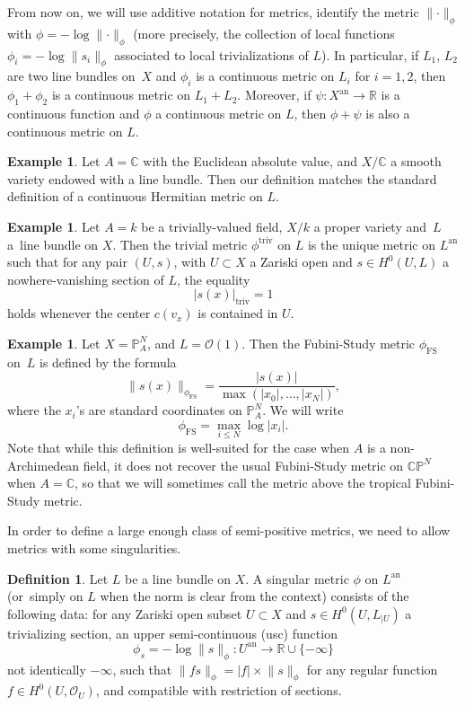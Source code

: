 \documentclass[JEP,XML,SOM,Unicode,published]{cedram}
\theoremstyle{definition}
\newtheorem{defn}[equation]{Definition}
\newtheorem{ex}[equation]{Example}
\newcommand \C{\mathbb C}
\newcommand \CP {\mathbb P}
\newcommand \R{\mathbb R}
\newcommand \gO {\mathcal O}
\newcommand{\an}{\mathrm{an}}
\DeclareMathOperator{\FS}{FS}
\DeclareMathOperator{\triv}{triv}
\begin{document}
From now on, we will use additive notation for metrics, \ie identify the metric $\lVert \cdot \rVert_{\phi}$ with $\phi = -\log \lVert \cdot \rVert_{\phi}$ (more precisely, the collection of local functions $\phi_i = - \log \lVert s_i \rVert_{\phi}$ associated to local trivializations of $L$). In particular, if $L_1$, $L_2$ are two line bundles on~$X$ and $\phi_i$ is a continuous metric on $L_i$ for $i=1,2$, then $\phi_1+\phi_2$ is a continuous metric on $L_1+L_2$. Moreover, if $\psi: X^{\an} \to \R$ is a continuous function and $\phi$ a continuous metric on $L$, then $\phi+ \psi$ is also a continuous metric on $L$.
\begin{ex} Let $A=\C$ with the Euclidean absolute value, and $X/\C$ a smooth varie\-ty endowed with a line bundle. Then our definition matches the standard definition of a continuous Hermitian metric on $L$.
\end{ex}
\begin{ex} Let $A=k$ be a trivially-valued field, $X/k$ a proper variety and~$L$ a~line bundle on $X$. Then the trivial metric $\phi^{\triv}$ on $L$ is the unique metric on $L^{\an}$ such that for any pair $(U, s)$, with $U \subset X$ a Zariski open and $s \in H^0(U,L)$ a nowhere-vanishing section of $L$, the equality\vspace*{-3pt}
\[
\lvert s(x) \rvert_{\triv} = 1
\]
holds whenever the center $c(v_x)$ is contained in $U$.
\end{ex}
\begin{ex} Let $X = \CP^N_A$, and $L = \gO(1)$. Then the Fubini-Study metric $\phi_{\FS}$ on~$L$ is defined by the formula\vspace*{-3pt}
\[
\lVert s(x) \rVert_{\phi_{\FS}} = \frac{\lvert s(x) \rvert}{\max (\lvert x_0 \rvert,\dots, \lvert x_N \rvert)},
\]
where the $x_i$'s are standard coordinates on $\CP^N_A$. We will write\vspace*{-3pt}
\[
\phi_{\FS} = \max_{i\le N} \log \lvert x_i \rvert.
\]
Note that while this definition is well-suited for the case when $A$ is a non-Archimedean field, it does not recover the usual Fubini-Study metric on $\C \CP^N$ when $A=\C$, so that we will sometimes call the metric above the tropical Fubini-Study metric.
\end{ex}
In order to define a large enough class of semi-positive metrics, we need to allow metrics with some singularities.
\begin{defn} Let $L$ be a line bundle on $X$. A singular metric $\phi$ on $L^{\an}$ (or~simply on $L$ when the norm is clear from the context) consists of the following data: for any Zariski open subset $U \subset X$ and $s \in H^0(U, L_{| U})$ a trivializing section, an upper semi-continuous (usc) function\vspace*{-3pt}
\[
\phi_{s} = - \log \lVert s \rVert_{\phi}: U^{\an} \to \R \cup \{- \infty \}
\]
not identically $-\infty$, such that $\lVert f s \rVert_{\phi} = \lvert f \rvert \times \lVert s \rVert_{\phi}$ for any regular function $f \in H^0(U, \gO_U)$, and compatible with restriction of sections.
\end{defn}
\end{document}
